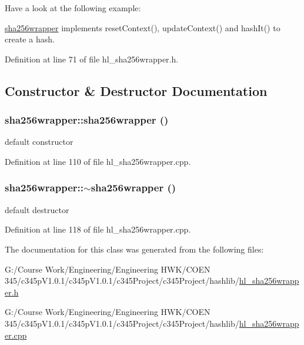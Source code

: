 Have a look at the following example:


\begin{DoxyCodeInclude}
\end{DoxyCodeInclude}


\hyperlink{classsha256wrapper}{sha256wrapper} implements resetContext(), updateContext() and hashIt() to create a hash. 

Definition at line 71 of file hl\_\-sha256wrapper.h.

\subsection{Constructor \& Destructor Documentation}
\hypertarget{classsha256wrapper_afbbb810ba41289d4702d08f9e74e176d}{
\subsubsection[{sha256wrapper}]{\setlength{\rightskip}{0pt plus 5cm}sha256wrapper::sha256wrapper ()}}
\label{classsha256wrapper_afbbb810ba41289d4702d08f9e74e176d}


default constructor 

Definition at line 110 of file hl\_\-sha256wrapper.cpp.\hypertarget{classsha256wrapper_a6f12b55e6d20d1b6cd629f6c8edda607}{
\subsubsection[{$\sim$sha256wrapper}]{\setlength{\rightskip}{0pt plus 5cm}sha256wrapper::$\sim$sha256wrapper ()}}
\label{classsha256wrapper_a6f12b55e6d20d1b6cd629f6c8edda607}


default destructor 

Definition at line 118 of file hl\_\-sha256wrapper.cpp.

The documentation for this class was generated from the following files:\begin{DoxyCompactItemize}
\item 
G:/Course Work/Engineering/Engineering HWK/COEN 345/c345pV1.0.1/c345pV1.0.1/c345Project/c345Project/hashlib/\hyperlink{hl__sha256wrapper_8h}{hl\_\-sha256wrapper.h}\item 
G:/Course Work/Engineering/Engineering HWK/COEN 345/c345pV1.0.1/c345pV1.0.1/c345Project/c345Project/hashlib/\hyperlink{hl__sha256wrapper_8cpp}{hl\_\-sha256wrapper.cpp}\end{DoxyCompactItemize}
